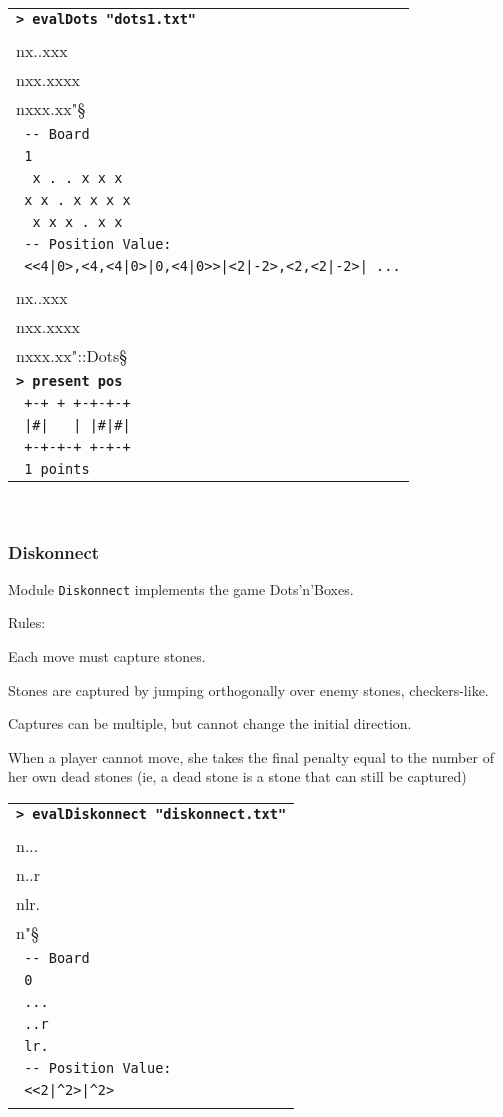 \documentclass[a4paper,12pt]{article}
\newcommand{\bash}[1]{\small\textbf{\lstinline§> #1§}\\}
\newcommand{\out}[1]{\small\lstinline§ #1§}
\newcommand{\haskellCode}{\fontfamily{pcr}\selectfont}
\newenvironment{sgcode}
	{ \haskellCode
	  \begin{tabular}{|p{0.9\textwidth}|}
      \hline	
	}
	{ \\\hline  
      \end{tabular} \\
	  \par 
	}
\begin{document}
\begin{sgcode}
\bash{evalDots "dots1.txt"}
\out{-- Read: "1\\nx..xxx\\nxx.xxxx\\nxxx.xx"} \\
\out{-- Board} \\
\out{1} \\
\verb§  x . . x x x § \\
\verb§ x x . x x x x§ \\
\verb§  x x x . x x § \\
\out{-- Position Value:} \\
\out{<<4|0>,<4,<4|0>|0,<4|0>>|<2|-2>,<2,<2|-2>| ...} \\
\bash{let pos = fromRaw "1\\nx..xxx\\nxx.xxxx\\nxxx.xx"::Dots}
\bash{present pos}
\verb§ +-+ + +-+-+-+§ \\
\verb§ |#|   | |#|#|§ \\
\verb§ +-+-+-+ +-+-+§ \\
\out{1 points}
\end{sgcode}

\subsubsection{Diskonnect}

Module \verb|Diskonnect| implements the game Dots'n'Boxes.

Rules:

Each move must capture stones.

Stones are captured by jumping orthogonally over enemy stones, checkers-like.

Captures can be multiple, but cannot change the initial direction.

When a player cannot move, she takes the final penalty equal to the number
of her own dead stones (ie, a dead stone is a stone that can still be captured)

\begin{sgcode}
\bash{evalDiskonnect "diskonnect.txt"}
\out{-- Read: "0\\n...\\n..r\\nlr.\\n"} \\
\out{-- Board} \\
\out{0} \\
\out{...} \\
\out{..r} \\
\out{lr.} \\
\out{-- Position Value:} \\
\out{<<2|^2>|^2>} \\
\end{sgcode}
\end{document}

